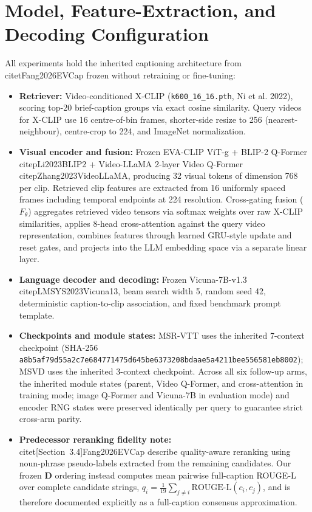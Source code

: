 \documentclass[11pt,a4paper]{article}
\begin{document}
\section{Model, Feature-Extraction, and Decoding Configuration}
All experiments hold the inherited captioning architecture from \\citet{Fang2026EVCap} frozen without retraining or fine-tuning:

\begin{itemize}
\item \textbf{Retriever:} Video-conditioned X-CLIP (\texttt{k600\_16\_16.pth}, Ni et al. 2022), scoring top-20 brief-caption groups via exact cosine similarity. Query videos for X-CLIP use 16 centre-of-bin frames, shorter-side resize to 256 (nearest-neighbour), centre-crop to 224, and ImageNet normalization.
\item \textbf{Visual encoder and fusion:} Frozen EVA-CLIP ViT-g + BLIP-2 Q-Former \\citep{Li2023BLIP2} + Video-LLaMA 2-layer Video Q-Former \\citep{Zhang2023VideoLLaMA}, producing 32 visual tokens of dimension 768 per clip. Retrieved clip features are extracted from 16 uniformly spaced frames including temporal endpoints at 224 resolution. Cross-gating fusion ($F_\theta$) aggregates retrieved video tensors via softmax weights over raw X-CLIP similarities, applies 8-head cross-attention against the query video representation, combines features through learned GRU-style update and reset gates, and projects into the LLM embedding space via a separate linear layer.
\item \textbf{Language decoder and decoding:} Frozen Vicuna-7B-v1.3 \\citep{LMSYS2023Vicuna13}, beam search width 5, random seed 42, deterministic caption-to-clip association, and fixed benchmark prompt template.
\item \textbf{Checkpoints and module states:} MSR-VTT uses the inherited 7-context checkpoint (SHA-256 \texttt{a8b5af79d55a2c7e684771475d645be6373208bdaae5a4211bee556581eb8002}); MSVD uses the inherited 3-context checkpoint. Across all six follow-up arms, the inherited module states (parent, Video Q-Former, and cross-attention in training mode; image Q-Former and Vicuna-7B in evaluation mode) and encoder RNG states were preserved identically per query to guarantee strict cross-arm parity.
\item \textbf{Predecessor reranking fidelity note:} \\citet[Section~3.4]{Fang2026EVCap} describe quality-aware reranking using noun-phrase pseudo-labels extracted from the remaining candidates. Our frozen \textbf{D} ordering instead computes mean pairwise full-caption ROUGE-L over complete candidate strings, $q_i = \frac{1}{19}\sum_{j\ne i}\mathrm{ROUGE\text{-}L}(c_i, c_j)$, and is therefore documented explicitly as a full-caption consensus approximation.
\end{itemize}
\end{document}
